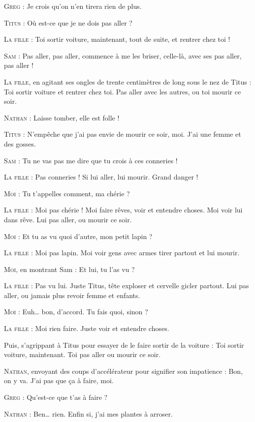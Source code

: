 \begin{dialogue}
\textsc{Greg} : Je crois qu’on n’en tirera rien de plus.

\textsc{Titus} : Où est-ce que je ne dois pas aller ?

\textsc{La fille} : Toi sortir voiture, maintenant, tout de suite, et rentrer chez toi !

\textsc{Sam} : Pas aller, pas aller, commence à me les briser, celle-là, avec ses pas aller, pas aller !

\textsc{La fille}, en agitant ses ongles de trente centimètres de long sous le nez de Titus : Toi sortir voiture et rentrer chez toi. Pas aller avec les autres, ou toi mourir ce soir.

\textsc{Nathan} : Laisse tomber, elle est folle !

\textsc{Titus} : N’empêche que j’ai pas envie de mourir ce soir, moi. J’ai une femme et des gosses.

\textsc{Sam} : Tu ne vas pas me dire que tu crois à ces conneries !

\textsc{La fille} : Pas conneries ! Si lui aller, lui mourir. Grand danger !

\textsc{Moi} : Tu t’appelles comment, ma chérie ?

\textsc{La fille} : Moi pas chérie ! Moi faire rêves, voir et entendre choses. Moi voir lui dans rêve. Lui pas aller, ou mourir ce soir.

\textsc{Moi} : Et tu as vu quoi d’autre, mon petit lapin ?

\textsc{La fille} : Moi pas lapin. Moi voir gens avec armes tirer partout et lui mourir.

\textsc{Moi}, en montrant Sam : Et lui, tu l’as vu ?

\textsc{La fille} : Pas vu lui. Juste Titus, tête exploser et cervelle gicler partout. Lui pas aller, ou jamais plus revoir femme et enfants.

\textsc{Moi} : Euh… bon, d’accord. Tu fais quoi, sinon ?

\textsc{La fille} : Moi rien faire. Juste voir et entendre choses.

Puis, s’agrippant à Titus pour essayer de le faire sortir de la voiture : Toi sortir voiture, maintenant. Toi pas aller ou mourir ce soir.

\textsc{Nathan}, envoyant des coups d’accélérateur pour signifier son impatience : Bon, on y va. J’ai pas que ça à faire, moi.

\textsc{Greg} : Qu’est-ce que t’as à faire ?

\textsc{Nathan} : Ben… rien. Enfin si, j’ai mes plantes à arroser.


\end{dialogue}
